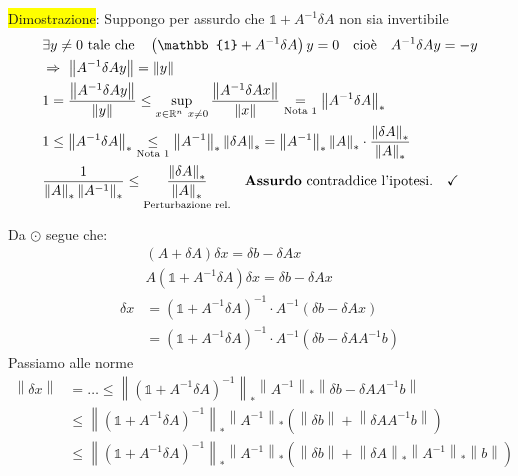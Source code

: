 \documentclass{article}
\begin{document}
\begin{itemize}
          \colorbox{yellow}{Dimostrazione}: Suppongo per assurdo che $\mathbb 1+A^{-1}\delta A$ non sia invertibile
          \begin{align*}
               & \exists y\ne 0\text{ tale che}\quad\left(\mathbb{1}+A^{-1}\delta A\right)y=0\quad\text{cioè}\quad A^{-1}\delta Ay=-y                                                                                                \\
               & \Rightarrow\ \left\|A^{-1}\delta Ay\right\|=\left\|y\right\|                                                                                                                                                        \\
               & 1=\frac{\left\|A^{-1}\delta Ay\right\|}{\left\|y\right\|}\le\sup_{x\in\mathbb R^n\ x\ne0}\frac{\left\|A^{-1}\delta Ax\right\|}{\left\|x\right\|}\underset{\text{Nota 1}}{=}\left\|A^{-1}\delta A\right\|_*          \\
               & 1\le\left\|A^{-1}\delta A\right\|_*\underset{\text{Nota 1}}{\le}\left\|A^{-1}\right\|_*\left\|\delta A\right\|_*=\left\|A^{-1}\right\|_*\left\|A\right\|_*\cdot\frac{\left\|\delta A\right\|_*}{\left\|A\right\|_*} \\
               & \frac{1}{\left\|A\right\|_*\left\|A^{-1}\right\|_*}\le\underset{\text{Perturbazione rel.}}{\frac{\left\|\delta A\right\|_*}{\left\|A\right\|_*}}\quad\text{\textbf{Assurdo} contraddice l'ipotesi.}\quad\checkmark
          \end{align*}

          Da $\odot$ segue che:
          \begin{align*}
                       & (A+\delta A)\delta x=\delta b-\delta Ax                                \\
                       & A(\mathbb 1+A^{-1}\delta A)\delta x=\delta b-\delta Ax                 \\
              \delta x & =(\mathbb 1+A^{-1}\delta A)^{-1}\cdot A^{-1}(\delta b-\delta Ax)       \\
                       & =(\mathbb 1+A^{-1}\delta A)^{-1}\cdot A^{-1}(\delta b-\delta AA^{-1}b)
          \end{align*}
          Passiamo alle norme
          \begin{align*}
              \left\|\delta x\right\| & =\dots\le\left\|\left(\mathbb 1+A^{-1}\delta A\right)^{-1}\right\|_*\left\|A^{-1}\right\|_*\left\|\delta b-\delta AA^{-1}b\right\|                                                         \\
                                      & \le\left\|\left(\mathbb 1+A^{-1}\delta A\right)^{-1}\right\|_*\left\|A^{-1}\right\|_*\left(\left\|\delta b\right\|+\left\|\delta AA^{-1}b\right\|\right)                                   \\
                                      & \le\left\|\left(\mathbb 1+A^{-1}\delta A\right)^{-1}\right\|_*\left\|A^{-1}\right\|_*\left(\left\|\delta b\right\|+\left\|\delta A\right\|_*\left\|A^{-1}\right\|_*\left\|b\right\|\right)
          \end{align*}


\end{itemize}
\end{document}
